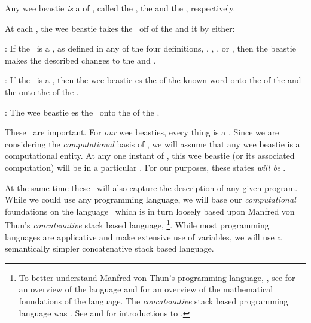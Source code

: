 \startDefinition[beastieBeing]

Any wee beastie \emph{is} a  of \lols, called the 
 , the   and the 
 \lol, respectively. 

At each , the wee beastie takes the 
 \lol\ off of the   and 
 it by either: 

\startitemize[n] 

\item {}: If the  \lol\ is a  
, as defined in any of the four definitions, 
\in[beastieBeing], \in[beastieActions], \in[beastieTests], or 
\in[beastieIdentity], then the beastie makes the described changes to the 
 and  . 

\item {}: If the  \lol\ is a  
, then the wee beastie es the 
 of the known word onto the  of the 
  and the   
onto the  of the  . 

\item {}: The wee beastie es the \lol\ 
onto the  of the  . 

\stopitemize 

\stopDefinition 

These \lols\ are important. For \emph{our} wee beasties, every thing is a 
\lol. Since we are considering the \emph{computational} basis of 
\quote{Reality}, we will assume that any wee beastie is a computational 
entity. At any one instant of \quote{time}, this wee beastie (or its 
associated computation) will be in a particular \quote{state}. For our 
purposes, these states \emph{will be} \lols.

At the same time these \lols\ will also capture the  
description of any given program. While we could use any programming 
language, we will base our \emph{computational} foundations on the 
language \joylol\ which is in turn loosely based upon Manfred von 
Thun's \emph{concatenative} stack based language, \footnote{To 
better understand Manfred von Thun's programming language, \type{joy}, see 
\cite{vonThun1994overview} for an overview of the language and 
\cite{vonThun1994mathematicalFoundations} for an overview of the 
mathematical foundations of the language. The \quote{original} 
\emph{concatenative} stack based programming language was . 
See \cite{brodie1987StartingForth} and \cite{brodie2004thinkingForth} for 
introductions to \type{Forth}.}. While most programming languages are 
applicative and make extensive use of variables, we will use a 
semantically simpler concatenative stack based language. 

